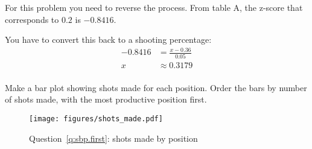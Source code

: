 \documentclass[letterpaper]{exam}
\begin{document}
\begin{questions}
\begin{parts}
            \begin{solution}
              For this problem you need to reverse the process.  From table A,
              the z-score that corresponds to $0.2$ is $-0.8416$.

              You have to convert this back to a shooting percentage:
              \begin{align*}
                -0.8416 & = \frac{x - 0.36}{0.05} \\
                x       & \approx \boxed{ 0.3179 } \\
              \end{align*}
            \end{solution}

        \end{parts}
        
        \ifprintanswers{}
      \else
        \newpage
      \fi


      \question[5] Make a bar plot showing shots made for each position.  Order
        the bars by number of shots made, with the most productive position first.\label{q:sbp.first}

        \begin{solution}
          \begin{figure}[H]
            \centering
            \texttt{[image: figures/shots\_made.pdf]}
            \caption{Question~\ref{q:sbp.first}: shots made by position}\label{fig:sbp}
          \end{figure}


\end{solution}
\end{questions}
\end{document}
